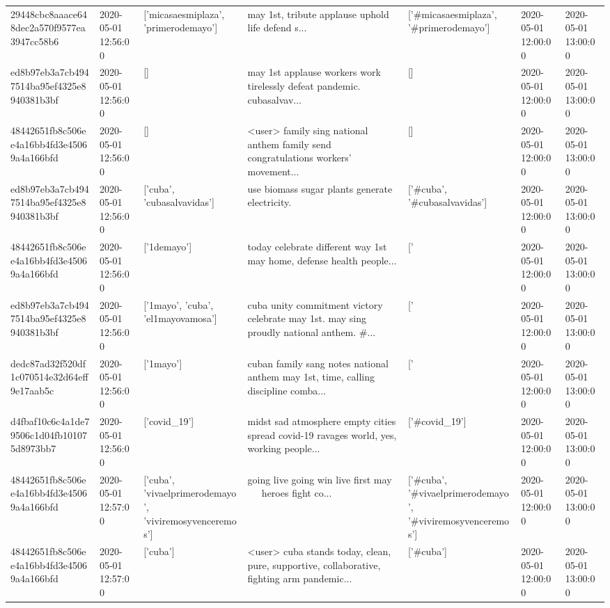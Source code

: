 \begin{tabular}{lllllll}
29448cbc8aaace648dec2a570f9577ea3947cc58b6 & 2020-05-01 12:56:00 & ['micasaesmiplaza', 'primerodemayo'] & may 1st, tribute applause uphold life defend s... & ['#micasaesmiplaza', '#primerodemayo'] & 2020-05-01 12:00:00 & 2020-05-01 13:00:00 \\
ed8b97eb3a7cb4947514ba95ef4325e8940381b3bf & 2020-05-01 12:56:00 & [] & may 1st applause workers work tirelessly defeat pandemic. cubasalvav... & [] & 2020-05-01 12:00:00 & 2020-05-01 13:00:00 \\
48442651fb8c506ee4a16bb4fd3e45069a4a166bfd & 2020-05-01 12:56:00 & [] & <user> family sing national anthem family send congratulations workers' movement... & [] & 2020-05-01 12:00:00 & 2020-05-01 13:00:00 \\
ed8b97eb3a7cb4947514ba95ef4325e8940381b3bf & 2020-05-01 12:56:00 & ['cuba', 'cubasalvavidas'] & use biomass sugar plants generate electricity. & ['#cuba', '#cubasalvavidas'] & 2020-05-01 12:00:00 & 2020-05-01 13:00:00 \\
48442651fb8c506ee4a16bb4fd3e45069a4a166bfd & 2020-05-01 12:56:00 & ['1demayo'] & today celebrate different way 1st may home, defense health people... & ['#1demayo'] & 2020-05-01 12:00:00 & 2020-05-01 13:00:00 \\
ed8b97eb3a7cb4947514ba95ef4325e8940381b3bf & 2020-05-01 12:56:00 & ['1mayo', 'cuba', 'el1mayovamosa'] & cuba unity commitment victory celebrate may 1st. may sing proudly national anthem. \#... & ['#1mayo', '#cuba', '#el1mayovamosa'] & 2020-05-01 12:00:00 & 2020-05-01 13:00:00 \\
dedc87ad32f520df1c070514e32d64eff9e17aab5c & 2020-05-01 12:56:00 & ['1mayo'] & cuban family sang notes national anthem may 1st, time, calling discipline comba... & ['#1mayo'] & 2020-05-01 12:00:00 & 2020-05-01 13:00:00 \\
d4fbaf10c6c4a1de79506c1d04fb101075d8973bb7 & 2020-05-01 12:56:00 & ['covid_19'] & midst sad atmosphere empty cities spread covid-19 ravages world, yes, working people... & ['#covid_19'] & 2020-05-01 12:00:00 & 2020-05-01 13:00:00 \\
48442651fb8c506ee4a16bb4fd3e45069a4a166bfd & 2020-05-01 12:57:00 & ['cuba', 'vivaelprimerodemayo', 'viviremosyvenceremos'] & going live going win live first may 👏👏👏👏👏 heroes fight co... & ['#cuba', '#vivaelprimerodemayo', '#viviremosyvenceremos'] & 2020-05-01 12:00:00 & 2020-05-01 13:00:00 \\
48442651fb8c506ee4a16bb4fd3e45069a4a166bfd & 2020-05-01 12:57:00 & ['cuba'] & <user> cuba stands today, clean, pure, supportive, collaborative, fighting arm pandemic... & ['#cuba'] & 2020-05-01 12:00:00 & 2020-05-01 13:00:00 \\

\end{tabular}

